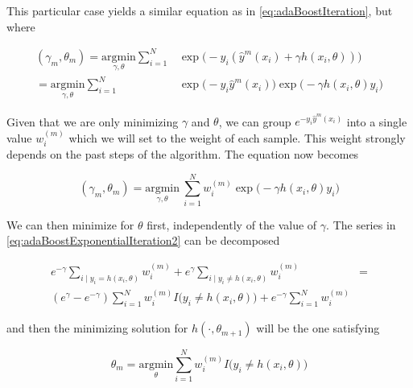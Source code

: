 This particular case yields a similar equation as in \cref{eq:adaBoostIteration}, but where

\begin{equation}\label{eq:sadaBoostExponentialIteration}
\begin{split}
(\gamma_{m}, \theta_{m}) = \underset{\gamma, \theta}{\mathrm{argmin}} \sum_{i=1}^{N} & \exp\big( -y_i (\hat{y}^{m}(x_i) + \gamma h(x_i,\theta) )\big) \\
= \underset{\gamma, \theta}{\mathrm{argmin}} \sum_{i=1}^{N} &
\exp\big( -y_i \hat{y}^{m}(x_i)\big) \exp\big(- \gamma h(x_i,\theta)y_i \big)
\end{split}
\end{equation}


Given that we are only minimizing $\gamma$ and $\theta$, we can group $e^{-y_i \hat{y}^{m}(x_i)}$ into a single value $w_i^{(m)}$ which we will set to the weight of each sample.
This weight strongly depends on the past steps of the algorithm.
The equation now becomes


\begin{equation}\label{eq:adaBoostExponentialIteration2}
(\gamma_{m}, \theta_{m}) = \underset{\gamma, \theta}{\mathrm{argmin}} \  \sum_{i=1}^{N} w_i^{(m)} \exp \big(-\gamma h(x_i,\theta)y_i \big)
\end{equation}

We can then minimize for $\theta$ first, independently of the value of $\gamma$.
The series in \cref{eq:adaBoostExponentialIteration2} can be decomposed

\begin{equation}\label{eq:adaBoostThetaDecomposition}
\begin{split}
e^{-\gamma} \sum_{i \mid y_i = h(x_i,\theta)} w_i^{(m)} + e^{\gamma} \sum_{i \mid y_i \neq h(x_i,\theta)} w_i^{(m)} & = \\
( e^{\gamma} - e^{-\gamma}) \sum_{i = 1}^{N} w_i^{(m)} I \big( y_i \neq h(x_i,\theta)  \big) + e^{-\gamma} \sum_{i = 1}^{N}  w_i^{(m)} &
\end{split}
\end{equation}


and then the minimizing solution for $h(\cdot, \theta_{m+1})$ will be the one satisfying

\begin{equation}\label{eq:adaBoostThetaMinimization}
\theta_{m} = \underset{ \theta}{\mathrm{argmin}} \sum_{i=1}^{N} w_i^{(m)} I \big( y_i \neq h(x_i,\theta)  \big)
\end{equation}

